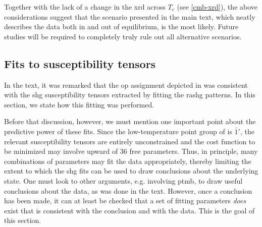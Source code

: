 Together with the lack of a change in the \gls{xrd} across $T_c$ (see \cref{cmb-xrd}), the above considerations suggest that the scenario presented in the main text, which neatly describes the data both in and out of equilibrium, is the most likely.
Future studies will be required to completely truly rule out all alternative scenarios.

\subsection{Fits to susceptibility tensors}\label{cmb-sec:fitting}

In the text, it was remarked that the \gls{op} assignment depicted in  was consistent with the \gls{shg} susceptibility tensors extracted by fitting the \gls{rashg} patterns.
In this section, we state how this fitting was performed.

Before that discussion, however, we must mention one important point about the predictive power of these fits.
Since the low-temperature point group of \cmb is $\bar{1}'$, the relevant susceptibility tensors are entirely unconstrained and the cost function to be minimized may involve upward of 36 free parameters.
Thus, in principle, many combinations of parameters may fit the data appropriately, thereby limiting the extent to which the \gls{shg} fits can be used to draw conclusions about the underlying state.
One must look to other arguments, e.g. involving \gls{ptmb}, to draw useful conclusions about the data, as was done in the text.
However, once a conclusion has been made, it can at least be checked that a set of fitting parameters \textit{does} exist that is consistent with the conclusion and with the data.
This is the goal of this section.


